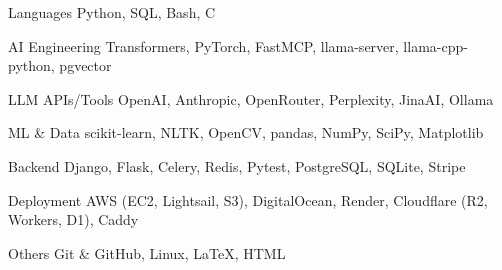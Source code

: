 

\begin{cvskills}

\cvskill
    {Languages} %
    {Python, SQL, Bash, C} %

\cvskill
    {AI Engineering} %
    {Transformers, PyTorch, FastMCP, llama-server, llama-cpp-python, pgvector} %

\cvskill
    {LLM APIs/Tools} %
    {OpenAI, Anthropic, OpenRouter, Perplexity, JinaAI, Ollama} %

\cvskill
    {ML \& Data} %
    {scikit-learn, NLTK, OpenCV, pandas, NumPy, SciPy, Matplotlib} %

\cvskill
    {Backend} %
    {Django, Flask, Celery, Redis, Pytest, PostgreSQL, SQLite, Stripe} %

\cvskill
    {Deployment} %
    {AWS (EC2, Lightsail, S3), DigitalOcean, Render, Cloudflare (R2, Workers, D1), Caddy} %

\cvskill
    {Others} %
    {Git \& GitHub, Linux, LaTeX, HTML} %

\end{cvskills}

